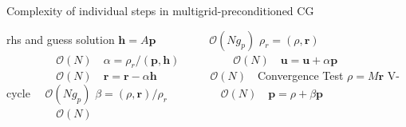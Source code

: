 \documentclass[times]{nlaauth}
\newcommand{\bs}[1]{\ensuremath{\boldsymbol #1}}
\begin{document}
\begin{algorithm}[ht] 
  \caption{Complexity of individual steps in multigrid-preconditioned CG} \label{alg:pcg} 
  \begin{algorithmic}[1]
    \Require rhs and guess
    \Ensure  solution
    \State $\bs{h} = A \bs{p}$ 											\Comment $~~\quad\quad\quad\quad\mathcal{O}(Ng_p)$
    \State $\rho_r = (\rho, \bs{r})$								\Comment $~~\quad\quad\quad\quad\mathcal{O}(N)~~~$
    \State $\alpha = \rho_r / ( \bs{p}, \bs{h} )$		\Comment $~~\quad\quad\quad\quad\mathcal{O}(N)~~~$
    \State $\bs{u} = \bs{u} + \alpha\bs{p}$					\Comment $~~\quad\quad\quad\quad\mathcal{O}(N)~~~$
    \State $\bs{r} = \bs{r} - \alpha\bs{h}$					\Comment $~~\quad\quad\quad\quad\mathcal{O}(N)~~~$
    \State Convergence Test
    \State $\rho = M\bs{r}$ 												\Comment V-cycle $\quad\mathcal{O}(Ng_p)$
    \State $\beta = (\rho, \bs{r}) / \rho_r$				\Comment $~~\quad\quad\quad\quad\mathcal{O}(N)~~~$
    \State $\bs{p} = \rho + \beta\bs{p}$						\Comment $~~\quad\quad\quad\quad\mathcal{O}(N)~~~$
    \EndWhile
  \end{algorithmic}
\end{algorithm}
\end{document}
